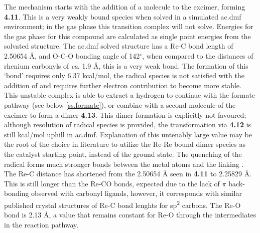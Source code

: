 The mechanism starts with the addition of a  molecule to the excimer, forming \textbf{4.11}. This is a very weakly bound species when solved in a simulated \gls{ac.dmf} environment; in the gas phase this transition complex will not solve. Energies for the gas phase for this compound are calculated as single point energies from the solvated structure. The \gls{ac.dmf} solved structure has a Re-C bond length of 2.50654 \r{A}, and O-C-O bonding angle of 142$^\circ$, when compared to the  distances of rhenium carbonyls of \textit{ca}. 1.9 \r{A}, this is a very weak bond. The formation of this `bond' requires only 6.37 kcal/mol, the radical species is not satisfied with the addition of  and requires further electron contribution to become more stable. This unstable complex is able to extract a hydrogen to continue with the formate pathway (see below \autoref{ss.formate}), or combine with a second molecule of the excimer to form a dimer \textbf{4.13}. This dimer formation is explicitly not favoured; although resolution of radical species is provided, the transformation via \textbf{4.12} is still  kcal/mol uphill in \gls{ac.dmf}. Explanation of this untenably large value may be the root of the choice in literature to utilize the Re-Re bound dimer species as the catalyst starting point, instead of the ground state.  The quenching of the radical forms much stronger bonds between the metal atoms and the linking . The Re-C distance has shortened from the 2.50654 \r{A} seen in \textbf{4.11} to 2.25829 \r{A}. This is still longer than the Re-CO bonds, expected due to the lack of $\pi$ back-bonding observed with carbonyl ligands, however, it corresponds with similar published crystal structures of Re-C bond lenghts for sp\textsuperscript{2} carbons\autocite{lukehart1977}. The Re-O bond is 2.13 \r{A}, a value that remains constant for Re-O through the intermediates in the reaction pathway.

